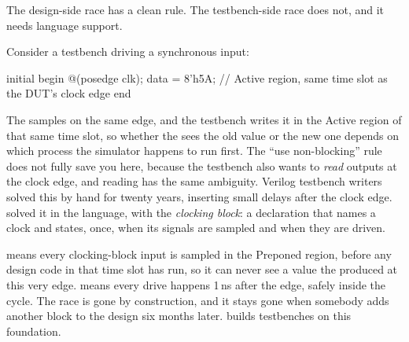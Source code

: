 The design-side race has a clean rule. The
testbench-side race does not, and it needs language support.

Consider a testbench driving a synchronous input:

\begin{svcode}
initial begin
  @(posedge clk);
  data = 8'h5A;    // Active region, same time slot as the DUT's clock edge
end
\end{svcode}

The \DUT samples  on the same edge, and the testbench writes it in
the Active region of that same time slot, so whether the \DUT sees the old
value or the new one depends on which process the simulator happens to run
first. The ``use non-blocking'' rule does not fully save you here, because the
testbench also wants to \emph{read} \DUT outputs at the clock edge, and
reading has the same ambiguity. Verilog testbench writers solved this by hand
for twenty years, inserting small delays after the clock edge. \SV{} solved it
in the language, with the \emph{clocking block}: a declaration that names a
clock and states, once, when its signals are sampled and when they are
driven.


 means every clocking-block input is sampled in the
Preponed region, before any design code in that time slot has run, so it can
never see a value the \DUT produced at this very edge. 
means every drive happens 1\,ns after the edge, safely inside the cycle. The
race is gone by construction, and it stays gone when somebody adds another
 block to the design six months later.  builds
testbenches on this foundation.

